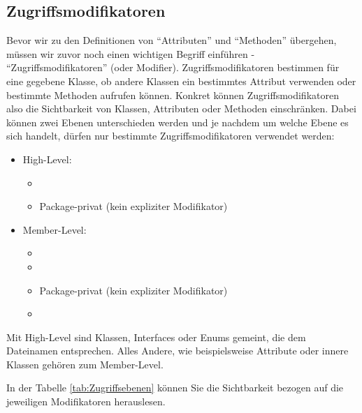 \documentclass{tuda-pub}
\begin{document}
  \subsection{Zugriffsmodifikatoren}
  \label{sec:Zugriff}
  Bevor wir zu den Definitionen von \enquote{Attributen} und \enquote{Methoden} übergehen, müssen
  wir zuvor noch einen wichtigen Begriff einführen - \enquote{Zugriffsmodifikatoren} (oder
  Modifier). Zugriffsmodifikatoren bestimmen für eine gegebene Klasse, ob andere Klassen ein
  bestimmtes Attribut verwenden oder bestimmte Methoden aufrufen können. Konkret können
  Zugriffsmodifikatoren also die Sichtbarkeit von Klassen, Attributen oder Methoden einschränken.
  Dabei können zwei Ebenen unterschieden werden und je nachdem um welche Ebene es sich handelt,
  dürfen nur bestimmte Zugriffsmodifikatoren verwendet werden:

  \begin{itemize}
    \item High-Level:
    \begin{itemize}
      \item {}
      \item Package-privat (kein expliziter Modifikator)
    \end{itemize}
    \item Member-Level:
    \begin{itemize}
      \item {}
      \item {}
      \item Package-privat (kein expliziter Modifikator)
      \item {}
    \end{itemize}
  \end{itemize}

  Mit High-Level sind Klassen, Interfaces oder Enums gemeint, die dem Dateinamen entsprechen.
  Alles Andere, wie beispielsweise Attribute oder innere Klassen gehören zum Member-Level.

  In der Tabelle \ref{tab:Zugriffsebenen} können Sie die Sichtbarkeit bezogen auf die jeweiligen
  Modifikatoren herauslesen.
\end{document}
